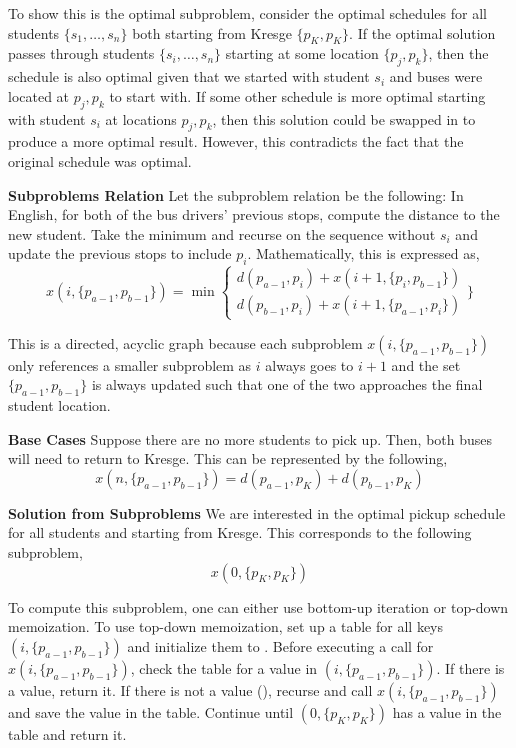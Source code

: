 \documentclass[12pt,twoside]{article}
\begin{document}
\begin{problems}
To show this is the optimal subproblem, consider the optimal schedules for
all students $\{s_1, \ldots, s_n\}$ both starting from Kresge $\{p_K, p_K\}$.
If the optimal solution passes through students $\{s_i, \ldots, s_n\}$
starting at some location $\{p_j, p_k\}$, then the schedule is also optimal
given that we started with student $s_i$ and buses were located at $p_j,
p_k$ to start with. If some other schedule is more optimal starting with
student $s_i$ at locations $p_j, p_k$, then this solution could be swapped in
to produce a more optimal result. However, this contradicts the fact that the
original schedule was optimal.

{\bf Subproblems Relation} Let the subproblem relation be the following: In
English, for both of the bus drivers' previous stops, compute the distance to
the new student. Take the minimum and recurse on the sequence without $s_i$
and update the previous stops to include $p_i$. Mathematically, this is
expressed as,
$$ x(i, \{p_{a-1}, p_{b-1}\}) = \min \begin{cases}
  d(p_{a-1}, p_i) + x(i + 1, \{p_i, p_{b-1}\}) \\
  d(p_{b-1}, p_i) + x(i + 1, \{p_{a-1}, p_i\})
\end{cases} \bigg\}$$

This is a directed, acyclic graph because each subproblem $x(i, \{p_{a-1},
p_{b-1}\})$ only references a smaller subproblem as $i$ always goes to $i +
1$ and the set $\{p_{a-1}, p_{b-1}\}$ is always updated such that one of the
two approaches the final student location.

{\bf Base Cases} Suppose there are no more students to pick up. Then, both
buses will need to return to Kresge. This can be represented by the
following,
$$ x(n, \{p_{a-1}, p_{b-1}\}) = d(p_{a-1}, p_K) + d(p_{b-1}, p_K) $$

{\bf Solution from Subproblems} We are interested in the optimal pickup
schedule for all students and starting from Kresge. This corresponds to the
following subproblem,
$$ x(0, \{p_K, p_K\}) $$

To compute this subproblem, one can either use bottom-up iteration or
top-down memoization. To use top-down memoization, set up a table for all
keys $(i, \{p_{a-1}, p_{b-1}\})$ and initialize them to .
Before executing a call for $x(i, \{p_{a-1}, p_{b-1}\})$, check the table for
a value in $(i, \{p_{a-1}, p_{b-1}\})$. If there is a value, return it. If
there is not a value (), recurse and call $x(i, \{p_{a-1},
p_{b-1}\})$ and save the value in the table. Continue until $(0, \{p_K,
p_K\})$ has a value in the table and return it.


\end{problems}
\end{document}
